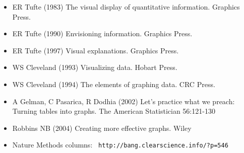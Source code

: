 \documentclass[12pt]{article}
\begin{document}
\hspace{0.5in} \begin{minipage}[t]{9in}
\begin{itemize}

\itemsep12pt

\item ER Tufte (1983) The visual display of quantitative information.
Graphics Press.
\item ER Tufte (1990) Envisioning information. Graphics Press.
\item ER Tufte (1997) Visual explanations. Graphics Press.

\vspace*{8mm}

\item WS Cleveland (1993) Visualizing data. Hobart Press.
\item WS Cleveland (1994) The elements of graphing data. CRC Press.

\vspace*{8mm}

\item A Gelman, C Pasarica, R Dodhia (2002) Let's practice what we preach:
Turning tables into graphs. The American Statistician 56:121-130

\vspace*{8mm}

\item Robbins NB (2004) Creating more effective graphs. Wiley

\vspace*{8mm}

\item Nature Methods columns: {\tt \color{myblue} http://bang.clearscience.info/?p=546}

\end{itemize}
\end{minipage}
\end{document}
